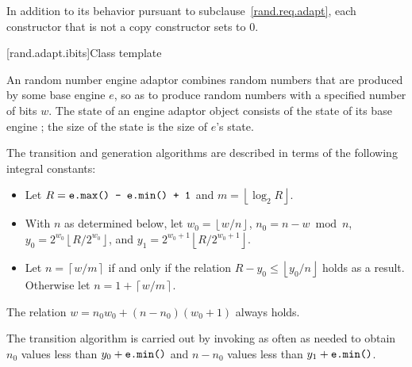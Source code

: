 \pnum
In addition to its behavior
pursuant to subclause~\ref{rand.req.adapt},
each constructor%
that is not a copy constructor
sets  to $0$.


[rand.adapt.ibits]{Class template }%
%

\pnum
An 
random number engine adaptor
combines random numbers
that are produced by some base engine $e$,
so as to produce random numbers
with a specified number of bits $w$.
The state%
%
of an 
engine adaptor object 
consists of
 the state  of its base engine ;
the size of the state is
 the size of $e$'s state.

\pnum
The transition and generation algorithms
are described in terms
of the following integral constants:%
\begin{itemize}
 \item
   Let
     $R = \texttt{e.max() - e.min() + 1}$
   and
     $m = \left\lfloor \log_2 R \right\rfloor$.
 \item
   With $n$ as determined below,
   let
     $w_0 = \left\lfloor w / n \right\rfloor$,
     $n_0 = n - w \bmod n$,
     $y_0 = 2^{w_0} \left\lfloor R / 2^{w_0} \right\rfloor$,
   and
     $y_1 = 2^{w_0 + 1} \left\lfloor R / 2^{w_0 + 1} \right\rfloor$.
 \item
   Let
     $n = \left\lceil w / m \right\rceil$
   if and only if the relation
     $R - y_0 \leq \left\lfloor y_0 / n \right\rfloor$
   holds as a result.
   Otherwise let
     $n = 1 + \left\lceil w / m \right\rceil$.
\end{itemize}
\begin{note}
 The relation
 $w = n_0 w_0 + (n - n_0)(w_0 + 1)$
 always holds.
\end{note}

\pnum
The transition algorithm%
%
is carried out by invoking 
as often as needed to obtain $n_0$
values less than $y_0 + \texttt{e.min()}$
and $n - n_0$ values less than $y_1 + \texttt{e.min()}$.

